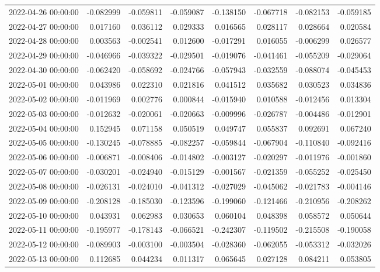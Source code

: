 \begin{tabular}{lrrrrrrr}
2022-04-26 00:00:00 & -0.082999 & -0.059811 & -0.059087 & -0.138150 & -0.067718 & -0.082153 & -0.059185 \\
2022-04-27 00:00:00 & 0.017160 & 0.036112 & 0.029333 & 0.016565 & 0.028117 & 0.028664 & 0.020584 \\
2022-04-28 00:00:00 & 0.003563 & -0.002541 & 0.012600 & -0.017291 & 0.016055 & -0.006299 & 0.026577 \\
2022-04-29 00:00:00 & -0.046966 & -0.039322 & -0.029501 & -0.019076 & -0.041461 & -0.055209 & -0.029064 \\
2022-04-30 00:00:00 & -0.062420 & -0.058692 & -0.024766 & -0.057943 & -0.032559 & -0.088074 & -0.045453 \\
2022-05-01 00:00:00 & 0.043986 & 0.022310 & 0.021816 & 0.041512 & 0.035682 & 0.030523 & 0.034836 \\
2022-05-02 00:00:00 & -0.011969 & 0.002776 & 0.000844 & -0.015940 & 0.010588 & -0.012456 & 0.013304 \\
2022-05-03 00:00:00 & -0.012632 & -0.020061 & -0.020663 & -0.009996 & -0.026787 & -0.004486 & -0.012901 \\
2022-05-04 00:00:00 & 0.152945 & 0.071158 & 0.050519 & 0.049747 & 0.055837 & 0.092691 & 0.067240 \\
2022-05-05 00:00:00 & -0.130245 & -0.078885 & -0.082257 & -0.059844 & -0.067904 & -0.110840 & -0.092416 \\
2022-05-06 00:00:00 & -0.006871 & -0.008406 & -0.014802 & -0.003127 & -0.020297 & -0.011976 & -0.001860 \\
2022-05-07 00:00:00 & -0.030201 & -0.024940 & -0.015129 & -0.001567 & -0.021359 & -0.055252 & -0.025450 \\
2022-05-08 00:00:00 & -0.026131 & -0.024010 & -0.041312 & -0.027029 & -0.045062 & -0.021783 & -0.004146 \\
2022-05-09 00:00:00 & -0.208128 & -0.185030 & -0.123596 & -0.199060 & -0.121466 & -0.210956 & -0.208262 \\
2022-05-10 00:00:00 & 0.043931 & 0.062983 & 0.030653 & 0.060104 & 0.048398 & 0.058572 & 0.050644 \\
2022-05-11 00:00:00 & -0.195977 & -0.178143 & -0.066521 & -0.242307 & -0.119502 & -0.215508 & -0.190058 \\
2022-05-12 00:00:00 & -0.089903 & -0.003100 & -0.003504 & -0.028360 & -0.062055 & -0.053312 & -0.032026 \\
2022-05-13 00:00:00 & 0.112685 & 0.044234 & 0.011317 & 0.065645 & 0.027128 & 0.084211 & 0.053805 \\

\end{tabular}
